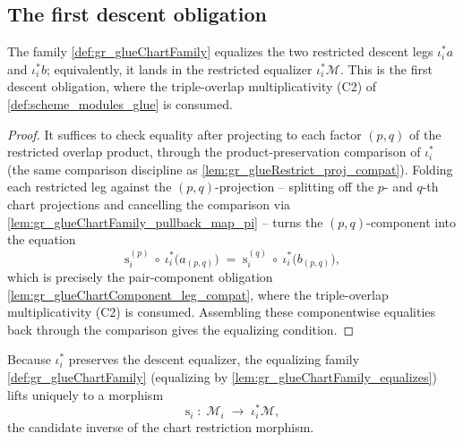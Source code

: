 \subsection{The first descent obligation}

\begin{lemma}
  \label{lem:gr_glueChartFamily_equalizes}
  The family \cref{def:gr_glueChartFamily} equalizes the two restricted descent legs
  \(\iota_i^{*}a\) and \(\iota_i^{*}b\); equivalently, it lands in the restricted
  equalizer \(\iota_i^{*}\mathcal{M}\). This is the first descent obligation, where the
  triple-overlap multiplicativity (C2) of \cref{def:scheme_modules_glue} is consumed.
\end{lemma}
\begin{proof}
    \leanok
  It suffices to check equality after projecting to each factor \((p,q)\) of the
  restricted overlap product, through the product-preservation comparison of
  \(\iota_i^{*}\) (the same comparison discipline as \cref{lem:gr_glueRestrict_proj_compat}).
  Folding each restricted leg against the \((p,q)\)-projection -- splitting off the
  \(p\)- and \(q\)-th chart projections and cancelling the comparison via
  \cref{lem:gr_glueChartFamily_pullback_map_pi} -- turns the \((p,q)\)-component into the
  equation
  \[
    \mathrm{s}_i^{(p)}\ \circ\ \iota_i^{*}\bigl(a_{(p,q)}\bigr)
      \;=\;
    \mathrm{s}_i^{(q)}\ \circ\ \iota_i^{*}\bigl(b_{(p,q)}\bigr),
  \]
  which is precisely the pair-component obligation
  \cref{lem:gr_glueChartComponent_leg_compat}, where the triple-overlap multiplicativity
  (C2) is consumed. Assembling these componentwise equalities back through the comparison
  gives the equalizing condition.
\end{proof}

\begin{definition}
  \label{def:gr_glueRestrictionInv}
  Because \(\iota_i^{*}\) preserves the descent equalizer, the equalizing family
  \cref{def:gr_glueChartFamily} (equalizing by \cref{lem:gr_glueChartFamily_equalizes})
  lifts uniquely to a morphism
  \[
    \mathrm{s}_i \;:\; \mathcal{M}_i \;\longrightarrow\; \iota_i^{*}\mathcal{M},
  \]
  the candidate inverse of the chart restriction morphism.
\end{definition}

